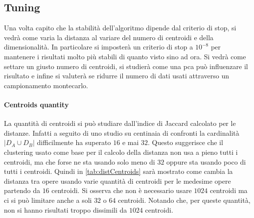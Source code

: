 \begin{toDo}
	\subsection{Tuning}
	Una volta capito che la stabilità dell'algoritmo dipende dal criterio di stop, si vedrà come varia la distanza al variare del numero di centroidi e della dimensionalità. In particolare si imposterà un criterio di stop a $10^{-8}$ per mantenere i risultati molto più stabili di quanto visto sino ad ora. Si vedrà come settare un giusto numero di centroidi, si studierà come una \gls{pca} può influenzare il risultato e infine si valuterà se ridurre il numero di dati usati attraverso un campionamento montecarlo.

	\paragraph{Centroids quantity}
	La quantità di centroidi si può studiare dall'indice di Jaccard calcolato per le distanze. Infatti a seguito di uno studio su centinaia di confronti la cardinalità $\left|D_A \cup D_B\right|$ difficilmente ha superato $16$ e mai $32$. Questo suggerisce che il clustering usato come base per il calcolo della distanza non usa a pieno tutti i centroidi, ma che forse ne sta usando solo meno di $32$ oppure sta usando poco di tutti i centroidi. Quindi in \cref{tab:distCentroids} sarà mostrato come cambia la distanza tra opere usando varie quantità di centroidi per le medesime opere partendo da $16$ centroidi. Si osserva che non è necessario usare $1024$ centroidi ma ci si può limitare anche a soli $32$ o $64$ centroidi. Notando che, per queste quantità, non si hanno risultati troppo dissimili da $1024$ centroidi.


\end{toDo}
